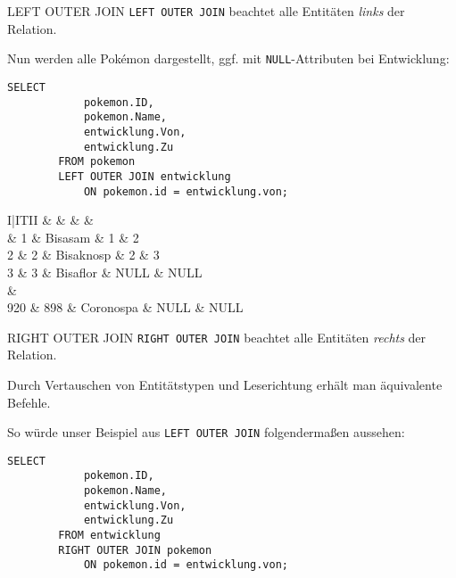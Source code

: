 \begin{sql}{LEFT OUTER JOIN}
    \texttt{LEFT OUTER JOIN} beachtet alle Entitäten \emph{links} der Relation.

    Nun werden alle Pokémon dargestellt, ggf. mit \texttt{NULL}-Attributen bei Entwicklung:

    \begin{lstlisting}[language=mysql]
        SELECT
            pokemon.ID,
            pokemon.Name,
            entwicklung.Von,
            entwicklung.Zu
        FROM pokemon
        LEFT OUTER JOIN entwicklung
            ON pokemon.id = entwicklung.von;
    \end{lstlisting}

    \setcounter{rownum}{0}
    \begin{tabular}{I|ITII}
                                   &     &  &  &  \\                          & 1                         & Bisasam                  & 1                       & 2                      \\
        2                          & 2                         & Bisaknosp                & 2                       & 3                      \\
        3                          & 3                         & Bisaflor                 & NULL                    & NULL                   \\
         &                                                                                \\
        920                        & 898                       & Coronospa                & NULL                    & NULL                   \\
    \end{tabular}
\end{sql}

\begin{sql}{RIGHT OUTER JOIN}
    \texttt{RIGHT OUTER JOIN} beachtet alle Entitäten \emph{rechts} der Relation.

    Durch Vertauschen von Entitätstypen und Leserichtung erhält man äquivalente Befehle.

    So würde unser Beispiel aus \texttt{LEFT OUTER JOIN} folgendermaßen aussehen:

    \begin{lstlisting}[language=mysql]
        SELECT
            pokemon.ID,
            pokemon.Name,
            entwicklung.Von,
            entwicklung.Zu
        FROM entwicklung
        RIGHT OUTER JOIN pokemon
            ON pokemon.id = entwicklung.von;
    \end{lstlisting}
\end{sql}

